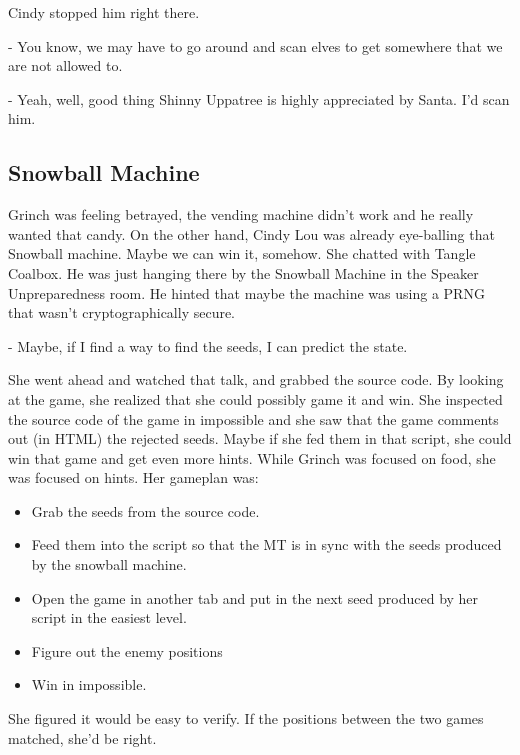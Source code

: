 Cindy stopped him right there.

- You know, we may have to go around and scan elves to get somewhere that we are not allowed to.

- Yeah, well, good thing Shinny Uppatree is highly appreciated by Santa. I'd scan him.

\subsection {Snowball Machine}

Grinch was feeling betrayed, the vending machine didn't work and he really wanted that candy. On the other hand, Cindy Lou was already eye-balling that Snowball machine.
Maybe we can win it, somehow. She chatted with {\color{codegreen}Tangle Coalbox}. He was just hanging there by the Snowball Machine in the Speaker Unpreparedness room. He hinted that maybe the machine was using a PRNG that wasn't cryptographically secure.

- Maybe, if I find a way to find the seeds, I can predict the state.

She went ahead and watched that talk, and grabbed the source code. By looking at the game, she realized that she could possibly game it and win.
She inspected the source code of the game in impossible and she saw that the game comments out (in HTML) the rejected seeds. Maybe if she fed them in that script, she could win that game and get even more hints. While Grinch was focused on food, she was focused on hints.
Her gameplan was:
\begin{itemize}
  \item Grab the seeds from the source code.
  \item Feed them into the script so that the MT is in sync with the seeds produced by the snowball machine.
  \item Open the game in another tab and put in the next seed produced by her script in the easiest level.
  \item Figure out the enemy positions
  \item Win in impossible.
\end{itemize}
She figured it would be easy to verify. If the positions between the two games matched, she'd be right.


